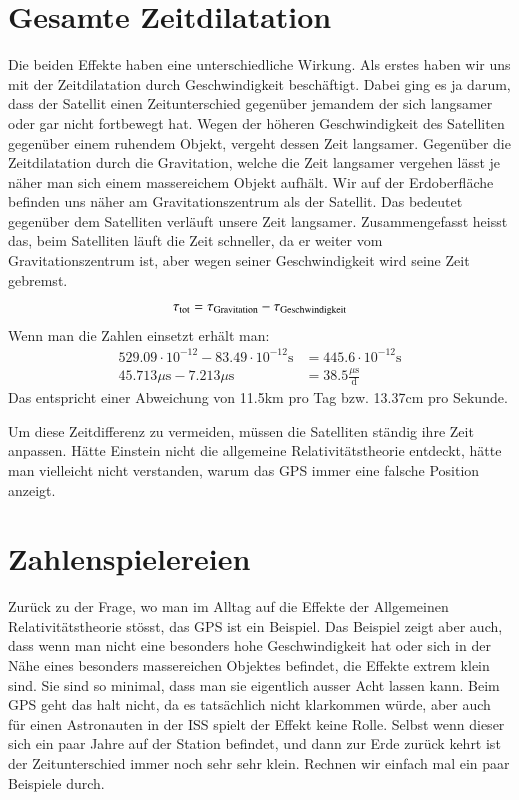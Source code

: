 \begin{refsection}
\section{Gesamte Zeitdilatation}
Die beiden Effekte haben eine unterschiedliche Wirkung. Als erstes haben wir uns mit der Zeitdilatation durch Geschwindigkeit beschäftigt. Dabei ging es ja darum, dass der Satellit einen Zeitunterschied gegenüber jemandem der sich langsamer oder gar nicht fortbewegt hat. Wegen der höheren Geschwindigkeit des Satelliten gegenüber einem ruhendem Objekt, vergeht dessen Zeit langsamer. Gegenüber die Zeitdilatation durch die Gravitation, welche die Zeit langsamer vergehen lässt je näher man sich einem massereichem Objekt aufhält. Wir auf der Erdoberfläche befinden uns näher am Gravitationszentrum als der Satellit. Das bedeutet gegenüber dem Satelliten verläuft unsere Zeit langsamer. Zusammengefasst heisst das, beim Satelliten läuft die Zeit schneller, da er weiter vom Gravitationszentrum ist, aber wegen seiner Geschwindigkeit wird seine Zeit gebremst.
\begin{equation}
\tau_{\text{tot}} = \tau_{\text{Gravitation}} - \tau_{\text{Geschwindigkeit}}\\
\end{equation}
Wenn man die Zahlen einsetzt erhält man:
\begin{align*}
529.09 \cdot 10^{-12} - 83.49 \cdot 10^{-12}\text{s} &= 445.6 \cdot 10^{-12}\text{s}
\\
45.713\mu{}\text{s} - 7.213\mu{}\text{s} &= 38.5\frac{\mu{}\text{s}}{\text{d}}
\end{align*}
Das entspricht einer Abweichung von 11.5km pro Tag bzw. 13.37cm pro Sekunde. 

Um diese Zeitdifferenz zu vermeiden, müssen die Satelliten ständig ihre Zeit anpassen. Hätte Einstein nicht die allgemeine Relativitätstheorie entdeckt, hätte man vielleicht nicht verstanden, warum das GPS immer eine falsche Position anzeigt. 

\section{Zahlenspielereien}
Zurück zu der Frage, wo man im Alltag auf die Effekte der Allgemeinen Relativitätstheorie stösst, das GPS ist ein Beispiel. Das Beispiel zeigt aber auch, dass wenn man nicht eine besonders hohe Geschwindigkeit hat oder sich in der Nähe eines besonders massereichen Objektes befindet, die Effekte extrem klein sind. Sie sind so minimal, dass man sie eigentlich ausser Acht lassen kann. Beim GPS geht das halt nicht, da es tatsächlich nicht klarkommen würde, aber auch für einen Astronauten in der ISS spielt der Effekt keine Rolle. Selbst wenn dieser sich ein paar Jahre auf der Station befindet, und dann zur Erde zurück kehrt ist der Zeitunterschied immer noch sehr sehr klein. Rechnen wir einfach mal ein paar Beispiele durch.
%
%


\end{refsection}
